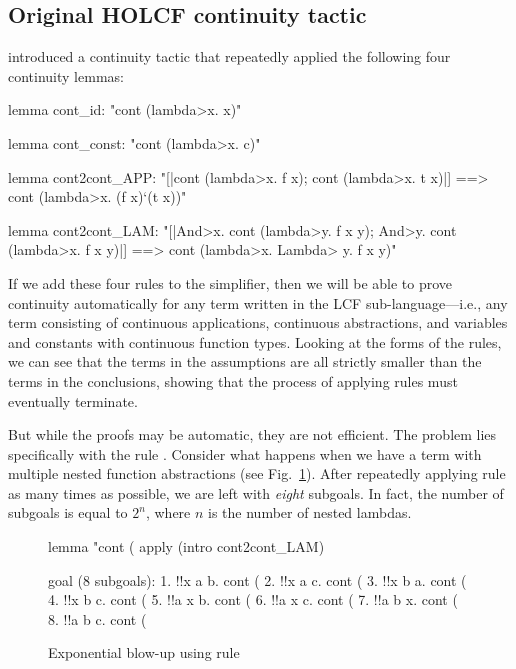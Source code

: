 \subsection{Original HOLCF continuity tactic}

 introduced a continuity tactic that repeatedly applied the following four continuity lemmas:

\begin{isacode}
lemma cont_id: "cont (\<lambda>x. x)"
\end{isacode}
\unmedskip
{}
\begin{isacode}
lemma cont_const: "cont (\<lambda>x. c)"
\end{isacode}
\unmedskip
{}
\begin{isacode}
lemma cont2cont_APP:
  "[|cont (\<lambda>x. f x); cont (\<lambda>x. t x)|] ==> cont (\<lambda>x. (f x)`(t x))"
\end{isacode}
\unmedskip
{}
\begin{isacode}
lemma cont2cont_LAM:
  "[|\<And>x. cont (\<lambda>y. f x y); \<And>y. cont (\<lambda>x. f x y)|] ==> cont (\<lambda>x. \<Lambda> y. f x y)"
\end{isacode}

If we add these four rules to the simplifier, then we will be able to prove continuity automatically for any term written in the LCF sub-language---i.e., any term consisting of continuous applications, continuous abstractions, and variables and constants with continuous function types. Looking at the forms of the rules, we can see that the terms in the assumptions are all strictly smaller than the terms in the conclusions, showing that the process of applying rules must eventually terminate.

But while the proofs may be automatic, they are not efficient. The problem lies specifically with the rule . Consider what happens when we have a term with multiple nested function abstractions (see Fig.~\ref{fig:holcf-cont-slow}). After repeatedly applying rule  as many times as possible, we are left with \emph{eight} subgoals. In fact, the number of subgoals is equal to $2^n$, where $n$ is the number of nested lambdas.

\begin{figure}
\begin{singlespace}
\begin{isabelle}
lemma "cont (%
  apply (intro cont2cont_LAM)

 goal (8 subgoals):
 1. !!x a b. cont (%
 2. !!x a c. cont (%
 3. !!x b a. cont (%
 4. !!x b c. cont (%
 5. !!a x b. cont (%
 6. !!a x c. cont (%
 7. !!a b x. cont (%
 8. !!a b c. cont (%
\end{isabelle}
\end{singlespace}
\caption{Exponential blow-up using rule }
\label{fig:holcf-cont-slow}
\end{figure}

